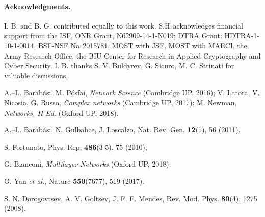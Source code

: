 \documentclass[aps, groupedaddress, superscriptaddress, prl, reprint]{revtex4-1}
\begin{document}
\paragraph*{\underline{Acknowledgments.}\!\!\!} I. B. and B. G. contributed equally to this work. 
S.H.\,acknowledges financial support from the ISF, ONR Grant, N62909-14-1-N019; DTRA Grant: HDTRA-1-10-1-0014, BSF-NSF No.\,2015781, MOST with JSF, MOST with MAECI, the Army Research Office, the BIU Center for Research in Applied Cryptography and Cyber Security. 
I. B. thanks S. V. Buldyrev, G. Sicuro, M. C. Strinati for valuable discussions. \vspace*{-0.2cm}

\begin{thebibliography}{99}

 A.--L. Barab\'asi, M. P\'osfai, {\em Network Science} (Cambridge UP, 2016); 
V. Latora, V. Nicosia, G. Russo, {\em Complex networks} (Cambridge UP, 2017); 
M. Newman, {\em Networks, II Ed.} (Oxford UP, 2018). 

 A.--L. Barab\'asi, N. Gulbahce, J. Loscalzo, Nat. Rev. Gen. \textbf{12}(1), 56 (2011).

 S. Fortunato, Phys. Rep. \textbf{486}(3-5), 75 (2010); 

 G. Bianconi, {\em Multilayer Networks} (Oxford UP, 2018).

 G. Yan {\em et al.}, Nature {\bf 550}(7677), 519 (2017).

 S. N. Dorogovtsev, A. V. Goltsev, J. F. F. Mendes, Rev. Mod. Phys. \textbf{80}(4), 1275 (2008).





\end{thebibliography}
\end{document}
